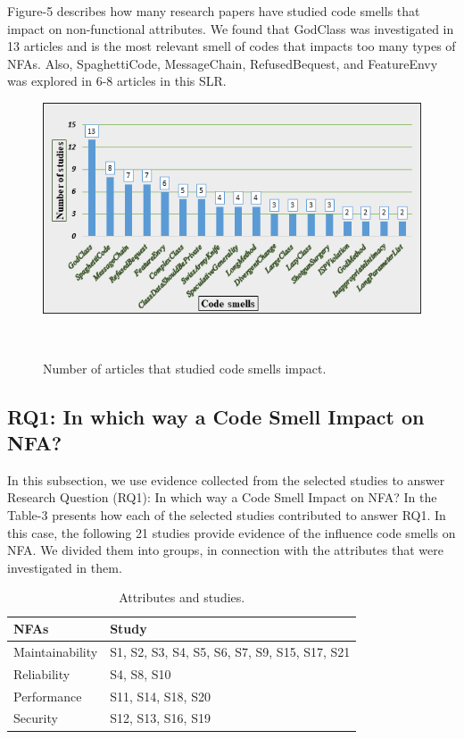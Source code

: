 \documentclass{sigchi}
\begin{document}
Figure-5 describes how many research papers have studied code smells that impact on non-functional attributes. We found that GodClass was investigated in 13 articles and is the most relevant smell of codes that impacts too many types of NFAs. Also, SpaghettiCode, MessageChain, RefusedBequest, and FeatureEnvy was explored in 6-8 articles in this SLR.  

\begin{figure}[h]
	\centering
	\includegraphics[width=1\columnwidth]{Figures/5}
	\caption{Number of articles that studied code smells impact.}~\label{fig:figure1}
\end{figure}

\subsection{RQ1: In which way a Code Smell Impact on NFA?}

In this subsection, we use evidence collected from the selected studies to answer Research Question (RQ1): In which way a Code Smell Impact on NFA? In the Table-3 presents how each of the selected studies contributed to answer RQ1. In this case, the following 21 studies provide evidence of the influence code smells on NFA. We divided them into groups, in connection with the attributes that were investigated in them.

\begin{table}[h]
	\small
	\begin{tabular}{ p{20mm} |  p{50mm}}
		\toprule
		\textbf{NFAs} & \textbf{Study}\\
		\midrule
		Maintainability & S1, S2, S3, S4, S5, S6, S7, S9, S15, S17, S21\\
		Reliability  & S4, S8, S10\\
	Performance & S11, S14, S18, S20\\
		Security & S12, S13, S16, S19 \\
		\bottomrule
	\end{tabular}
	\caption{Attributes and studies. }~\label{tab:in_ex_criteria}
\end{table}
\end{document}
